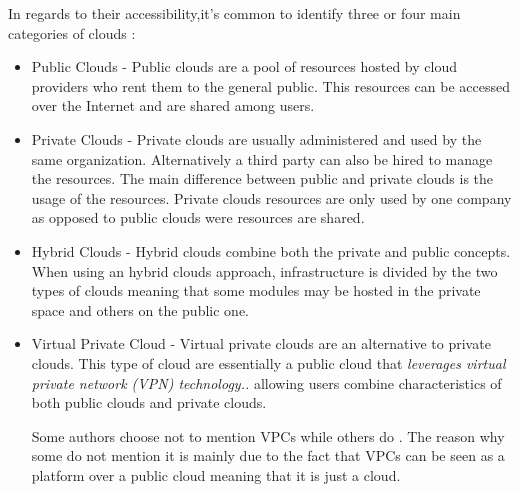         In regards to their accessibility,it's common to identify three or four main categories of clouds \cite{Zhang2010,Garrison2012,Garrison2012,Khajeh-Hosseini2012} :
        	\begin{itemize}
            	\item{Public Clouds} - Public clouds are a pool of resources hosted by cloud providers who rent them to the general public. This resources can be accessed over the Internet and are shared among users. 
                
				\item{Private Clouds} - Private clouds are usually administered and used by the same organization. Alternatively a third party can also be hired to manage the resources. The main difference between public and private clouds is the usage of the resources. Private clouds resources are only used by one company as opposed to public clouds were resources are shared.

                \item{Hybrid Clouds} - Hybrid clouds combine both the private and public concepts. When using an hybrid clouds approach, infrastructure is divided by the two types of clouds meaning that some modules may be hosted in the private space and others on the public one.
                
                \item{Virtual Private Cloud} - Virtual private clouds are an alternative to private clouds. This type of cloud are essentially a public cloud that \textit{leverages virtual private network (VPN) technology..}\cite{Zhang2010} allowing users combine characteristics of both public clouds and private clouds. 
                
                Some authors choose not to mention VPCs \cite{Garrison2012,Garrison2012,Khajeh-Hosseini2012} while others do \cite{Zhang2010}. The reason why some do not mention it is mainly due to the fact that VPCs can be seen as a platform over a public cloud meaning that it is just a cloud. 
                
			\end{itemize}
        
